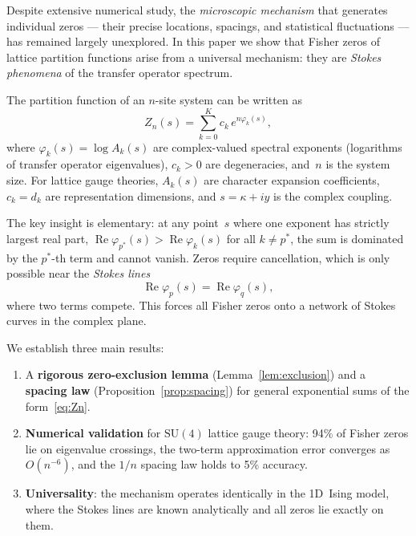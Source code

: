 \documentclass[12pt]{article}
\theoremstyle{definition}
\theoremstyle{remark}
\newcommand{\SU}{\mathrm{SU}}
\newcommand{\re}{\operatorname{Re}}
\begin{document}
Despite extensive numerical study, the \emph{microscopic mechanism}
that generates individual zeros --- their precise locations, spacings,
and statistical fluctuations --- has remained largely unexplored.
In this paper we show that Fisher zeros of lattice partition functions
arise from a universal mechanism: they are \emph{Stokes phenomena}
of the transfer operator spectrum.

The partition function of an $n$-site system can be written as
\begin{equation}\label{eq:Zn}
Z_n(s) = \sum_{k=0}^{K} c_k\, e^{n\varphi_k(s)},
\end{equation}
where $\varphi_k(s) = \log A_k(s)$ are complex-valued spectral
exponents (logarithms of transfer operator eigenvalues), $c_k > 0$
are degeneracies, and~$n$ is the system size.  For lattice gauge
theories, $A_k(s)$ are character expansion coefficients, $c_k = d_k$
are representation dimensions, and $s = \kappa + iy$ is the complex
coupling.

The key insight is elementary: at any point~$s$ where one exponent
has strictly largest real part, $\re\varphi_{p^*}(s) > \re\varphi_k(s)$
for all $k \neq p^*$, the sum is dominated by the $p^*$-th term and
cannot vanish.  Zeros require cancellation, which is only possible
near the \emph{Stokes lines}
\begin{equation}\label{eq:Stokes}
\re\varphi_p(s) = \re\varphi_q(s),
\end{equation}
where two terms compete.  This forces all Fisher zeros onto a network
of Stokes curves in the complex plane.

We establish three main results:
\begin{enumerate}
\item A \textbf{rigorous zero-exclusion lemma} (Lemma~\ref{lem:exclusion})
  and a \textbf{spacing law} (Proposition~\ref{prop:spacing}) for
  general exponential sums of the form~\eqref{eq:Zn}.

\item \textbf{Numerical validation} for $\SU(4)$ lattice gauge theory:
  94\% of Fisher zeros lie on eigenvalue crossings, the two-term
  approximation error converges as $O(n^{-6})$, and the $1/n$
  spacing law holds to 5\% accuracy.

\item \textbf{Universality}: the mechanism operates identically in
  the 1D~Ising model, where the Stokes lines are known analytically
  and all zeros lie exactly on them.
\end{enumerate}
\end{document}
